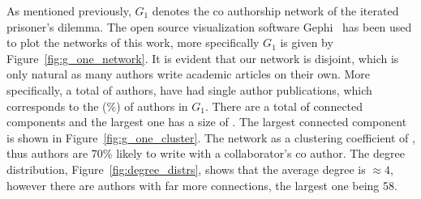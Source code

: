 \documentclass{article}
\theoremstyle{definition}
\newcommand{\isolated}{}
\newcommand{\isolatedpercentage}{}
\newcommand{\connectedcomponents}{}
\newcommand{\largestcc}{}
\newcommand{\clustering}{}
\begin{document}
As mentioned previously, \(G_1\) denotes the co authorship network of the iterated
prisoner's dilemma. The open source visualization software Gephi~\cite{ICWSM09154}
has been used
to plot the networks of this work, more specifically \(G_1\) is given by Figure~\ref{fig:g_one_network}. %
It is evident that our network is disjoint, which is only natural as many authors
write academic articles on their own. More specifically, a total of \isolated authors,
have had single author publications, which corresponds to the \isolatedpercentage (\%)
of authors in \(G_1\). There are a total of \connectedcomponents connected components
and the largest one has a size of \largestcc. The largest connected component is shown in
Figure~\ref{fig:g_one_cluster}. %
The network as a clustering coefficient of \clustering, thus authors are 70\% likely
to write with a collaborator's co author. 
The degree distribution, Figure~\ref{fig:degree_distrs}, shows that the
average degree is \(\approx4\), however there are authors with far more connections,
the largest one being 58.
\end{document}
